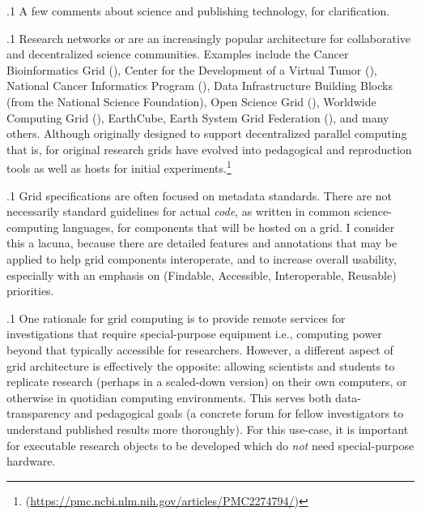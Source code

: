 \documentclass[11pt, twoside]{article}
\begin{document}
{\p.1{%
\noindent{}A few comments about
science and publishing technology, for clarification.
}%

\p.1{%
Research networks or  are an increasingly popular
architecture for collaborative and decentralized
science communities. Examples include the
Cancer Bioinformatics Grid (),
Center for the Development of
a Virtual Tumor (), National Cancer Informatics Program (),
Data Infrastructure Building Blocks (from the
National Science Foundation), Open Science Grid (),
Worldwide  Computing Grid (), EarthCube, Earth System Grid Federation (), and many others.
Although originally designed to support decentralized
parallel computing \mdash{} that is, for original
research \mdash{} grids have evolved into
pedagogical and reproduction tools as well
as hosts for initial experiments.\footnote{\raggedright{} %
\hspace*{19pt}(\href{https://pmc.ncbi.nlm.nih.gov/articles/PMC2274794/}{https://pmc.ncbi.nlm.nih.gov/articles/PMC2274794/})}
}%

\p.1{%
Grid specifications are often focused on metadata standards.
There are not necessarily standard guidelines for actual
\textit{code}, as written in common science-computing languages, for
components that will be hosted on a grid.  I consider this a
lacuna, because there are detailed features and annotations that may be
applied to help grid components interoperate, and to
increase overall usability, especially with an
emphasis on  (Findable, Accessible, Interoperable,
Reusable) priorities.
}%

\p.1{%
One rationale for grid computing
is to provide remote services for investigations that
require special-purpose equipment \mdash{} i.e., computing
power beyond that typically accessible for researchers. However, a different
aspect of grid architecture is effectively the
opposite: allowing scientists and students to replicate
research (perhaps in a scaled-down version) on their own
computers, or otherwise in quotidian computing environments.
This serves both data-transparency and pedagogical goals
(a concrete forum for fellow investigators to understand published
results more thoroughly). For this use-case, it is important
for executable research objects to be developed
which do \textit{not} need special-purpose hardware.
}%

}
\end{document}
